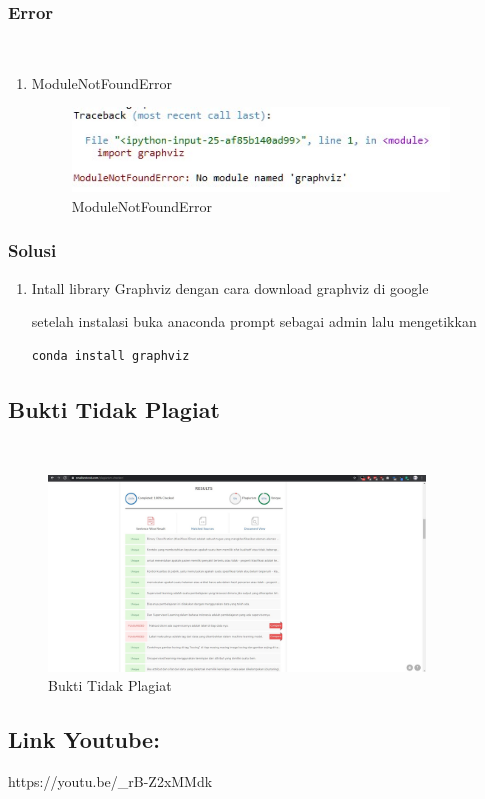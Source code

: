\subsubsection{Error}
\hfill\\
\begin{enumerate}
\item ModuleNotFoundError

\begin{figure}[H]
\centerline{\includegraphics[width=10cm]{figures/1174070/2/error1.jpg}}
\caption{ModuleNotFoundError}
\label{labelgambar}
\end{figure}
\end{enumerate}

\subsubsection{Solusi}
\begin{enumerate}
\item Intall library Graphviz dengan cara download graphviz di google

setelah instalasi buka anaconda prompt sebagai admin lalu mengetikkan
\begin{lstlisting}
conda install graphviz
\end{lstlisting} 
\end{enumerate}

\subsection{Bukti Tidak Plagiat}
\hfill\\
\begin{figure}[H]
\centerline{\includegraphics[width=10cm]{figures/1174070/2/plagiat.jpg}}
\caption{Bukti Tidak Plagiat}
\label{labelgambar}
\end{figure}

\subsection{Link Youtube:}
https://youtu.be/\_rB-Z2xMMdk